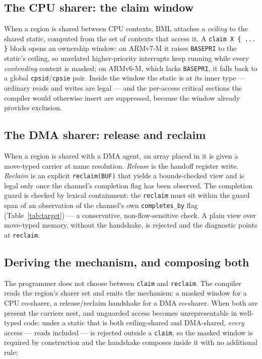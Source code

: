 \documentclass[10pt,twocolumn]{article}
\begin{document}
\subsection{The CPU sharer: the claim window}

When a region is shared between CPU contexts, BML attaches a \emph{ceiling} to
the shared static, computed from the set of contexts that access it. A
\lstinline!claim X { ... }! block opens an ownership window: on ARMv7-M it raises
\texttt{BASEPRI} to the static's ceiling, so unrelated higher-priority
interrupts keep running while every \emph{contending} context is masked; on
ARMv6-M, which lacks \texttt{BASEPRI}, it falls back to a global
\texttt{cpsid}/\texttt{cpsie} pair. Inside the window the static is at its
inner type --- ordinary reads and writes are legal --- and the per-access critical
sections the compiler would otherwise insert are suppressed, because the window
already provides exclusion.

\subsection{The DMA sharer: release and reclaim}

When a region is shared with a DMA agent, an array placed in it is given a
move-typed carrier at name resolution. \emph{Release} is the handoff register
write. \emph{Reclaim} is an explicit \lstinline!reclaim(BUF)! that yields a
bounds-checked view and is legal only once the channel's completion flag has been
observed. The completion guard is checked by lexical containment: the
\lstinline!reclaim! must sit within the guard span of an observation of the
channel's own \texttt{completes\_by} flag (Table~\ref{tab:target}) --- a
conservative, non-flow-sensitive check. A plain view over
move-typed memory, without the handshake, is rejected and the diagnostic points
at \lstinline!reclaim!.

\subsection{Deriving the mechanism, and composing both}

The programmer does not choose between \lstinline!claim! and
\lstinline!reclaim!. The compiler reads the region's sharer set and emits the
mechanism: a masked window for a CPU co-sharer, a release/reclaim handshake for a
DMA co-sharer. When both are present the carriers nest, and unguarded access
becomes unrepresentable in well-typed code: under a static that is both
ceiling-shared and DMA-shared, \emph{every} access --- reads included --- is
rejected outside a \lstinline!claim!, so the masked window is required by
construction and the handshake composes inside it with no additional rule:
\end{document}
